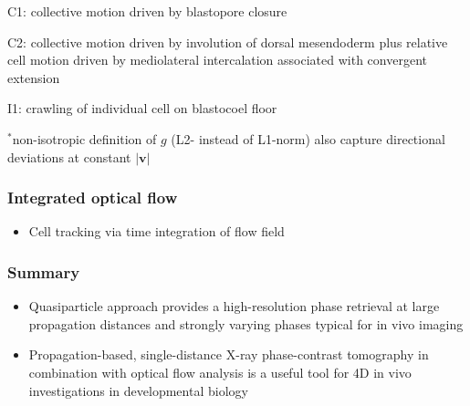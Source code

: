 \documentclass{beamer}
\renewcommand{\vec}{\mathbold}
\newcommand{\abs}[1]{\left| #1 \right|} %
\def\imh{0.35\textheight}
\begin{document}
\begin{frame}
{    C1: collective motion driven by blastopore closure 

    C2: collective motion driven by involution of dorsal mesendoderm
    plus relative cell motion driven by mediolateral intercalation
    associated with convergent extension}

  I1: crawling of individual cell on blastocoel floor

  \tiny{$^*$non-isotropic definition of $g$
    (L2- instead of L1-norm) also capture directional deviations at
    constant $\abs{\vec{v}}$}
\end{frame}

\begin{frame}
  \frametitle{Integrated optical flow}
  \begin{itemize}
  \item Cell tracking via time integration of flow field
  \end{itemize}
  \vfill
  \centering
  \vfill
\end{frame}

\begin{frame}
  \frametitle{Summary}
  \begin{itemize}
  \item Quasiparticle approach provides a high-resolution phase
    retrieval at large propagation distances and strongly varying
    phases typical for in vivo imaging
  \item Propagation-based, single-distance X-ray phase-contrast
    tomography in combination with optical flow analysis is a useful
    tool for 4D in vivo investigations in developmental biology
  \end{itemize}
\end{frame}
\end{document}
